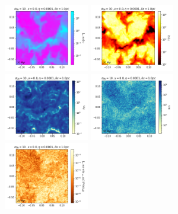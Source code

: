 \documentclass[iop,apj,numberedappendix,twocolappendix]{emulateapj}
\begin{document}

\begin{figure}
\centering
\includegraphics[trim=0.0cm 0.00cm 0.0cm 0.0cm,clip=true,width=0.33\textwidth]{csc_figs/rho1pcPm0e-4_00.png}
\includegraphics[trim=0.0cm 0.00cm 0.0cm 0.0cm,clip=true,width=0.33\textwidth]{csc_figs/tt1pcPm0e-4_00.png}
\includegraphics[trim=0.0cm 0.00cm 0.0cm 0.0cm,clip=true,width=0.33\textwidth]{csc_figs/Pm1pcPm0e-4_00.png}
\includegraphics[trim=0.0cm 0.00cm 0.0cm 0.0cm,clip=true,width=0.33\textwidth]{csc_figs/Rm1pcPm0e-4_00.png}
\includegraphics[trim=0.0cm 0.00cm 0.0cm 0.0cm,clip=true,width=0.33\textwidth]{csc_figs/pb1pcPm0e-4_00.png}

\end{figure}
\end{document}
